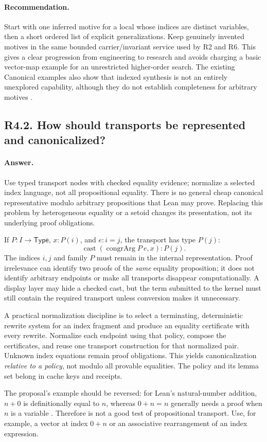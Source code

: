 \documentclass[11pt,a4paper]{article}
\newcommand{\code}[1]{\texttt{\detokenize{#1}}}
\newcommand{\type}{\ensuremath{\mathsf{Type}}}
\newcommand{\answer}{\paragraph{Answer.}}
\newcommand{\recommend}{\paragraph{Recommendation.}}
\theoremstyle{definition}
\theoremstyle{remark}
\begin{document}
\recommend Start with one inferred motive for a local whose indices are distinct
variables, then a short ordered list of explicit generalizations. Keep genuinely
invented motives in the same bounded carrier/invariant service used by R2 and
R6. This gives a clear progression from engineering to research and avoids
charging a basic vector-map example for an unrestricted higher-order search.
The existing Canonical examples also show that indexed synthesis is not an
entirely unexplored capability, although they do not establish completeness for
arbitrary motives \cite{canonical}.

\subsection{R4.2. How should transports be represented and canonicalized?}
\answer Use typed transport nodes with checked equality evidence; normalize a
selected index language, not all propositional equality. There is no general
cheap canonical representative modulo arbitrary propositions that Lean may
prove. Replacing this problem by heterogeneous equality or a setoid changes its
presentation, not its underlying proof obligations.

If $P:I\to\type$, $x:P(i)$, and $e:i=j$, the transport has type $P(j)$:
\[
 \operatorname{cast}(\operatorname{congrArg}P\ e,x):P(j).
\]
The indices $i,j$ and family $P$ must remain in the internal representation.
Proof irrelevance can identify two proofs of the \emph{same} equality proposition;
it does not identify arbitrary endpoints or make all transports disappear
computationally. A display layer may hide a checked cast, but the term submitted
to the kernel must still contain the required transport unless conversion makes
it unnecessary.

A practical normalization discipline is to select a terminating, deterministic
rewrite system for an index fragment and produce an equality certificate with
every rewrite. Normalize each endpoint using that policy, compose the
certificates, and reuse one transport construction for that normalized pair.
Unknown index equations remain proof obligations. This yields canonicalization
\emph{relative to a policy}, not modulo all provable equalities. The policy and
its lemma set belong in cache keys and receipts.

The proposal's example should be reversed: for Lean's natural-number addition,
$n+0$ is definitionally equal to $n$, whereas $0+n=n$ generally needs a proof
when $n$ is a variable \cite{leaninductbook}. Therefore
\code{Vec A (n + 0)} is not a good test of propositional transport. Use, for
example, a vector at index $0+n$ or an associative rearrangement of an index
expression.
\end{document}

